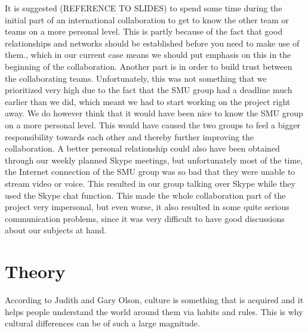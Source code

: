 It is suggested (REFERENCE TO SLIDES) to spend some time during the initial part of an international collaboration to get to know the other team or teams on a more personal level. This is partly because of the fact that good relationships and networks should be established before you need to make use of them., which in our current case means we should put emphasis on this in the beginning of the collaboration. Another part is in order to build trust between the collaborating teams. Unfortunately, this was not something that we prioritized very high due to the fact that the SMU group had a deadline much earlier than we did, which meant we had to start working on the project right away. We do however think that it would have been nice to know the SMU group on a more personal level. This would have caused the two groups to feel a bigger responsibility towards each other and thereby further improving the collaboration. A better personal relationship could also have been obtained through our weekly planned Skype meetings, but unfortunately most of the time, the Internet connection of the SMU group was so bad that they were unable to stream video or voice. This resulted in our group talking over Skype while they used the Skype chat function. This made the whole collaboration part of the project very impersonal, but even worse, it also resulted in some quite serious communication problems, since it was very difficult to have good discussions about our subjects at hand.


\section{Theory}

According to Judith and Gary Olson, culture is something that is acquired and it helps people understand the world around them via habits and rules. This is why cultural differences can be of such a large magnitude.
 
